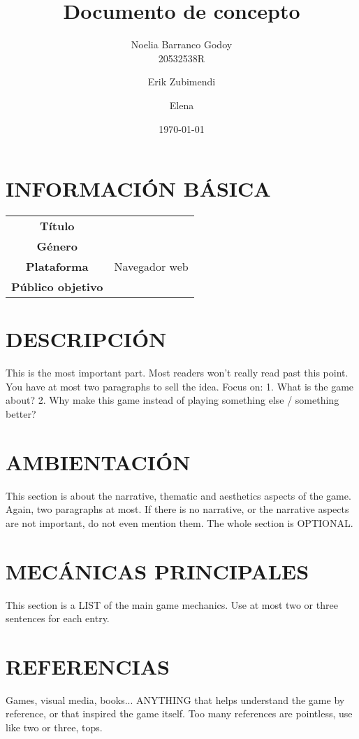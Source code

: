 \documentclass{article}
\title{Documento de concepto} %
\author{Noelia Barranco Godoy \\ 20532538R
\and Erik Zubimendi \and Elena } %
\date{\today} %
\begin{document}
    \maketitle %
    
    \section{INFORMACIÓN BÁSICA}
    
    \begin{tabular}{||c|c||}
        \hline
        \textbf{Título} & \\
        \textbf{Género} & \\
        \textbf{Plataforma} & Navegador web\\
        \textbf{Público objetivo} & \\
        \hline
    \end{tabular}

    \section{DESCRIPCIÓN}
    This is the most important part. Most readers won’t really read past this point. You have at most two paragraphs to sell the idea. Focus on:
    1. What is the game about?
    2. Why make this game instead of playing something else / something better?

    \section{AMBIENTACIÓN}
    This section is about the narrative, thematic and aesthetics aspects of the game. 
    Again, two paragraphs at most. If there is no narrative, or the narrative aspects are not important, do not even mention them. 
    The whole section is OPTIONAL.

    \section{MECÁNICAS PRINCIPALES}
    This section is a LIST of the main game mechanics. Use at most two or three sentences for each entry.

    \section{REFERENCIAS}
    Games, visual media, books... 
    ANYTHING that helps understand the game by reference,
    or that inspired the game itself. Too many references are pointless,
    use like two or three, tops.
\end{document}

